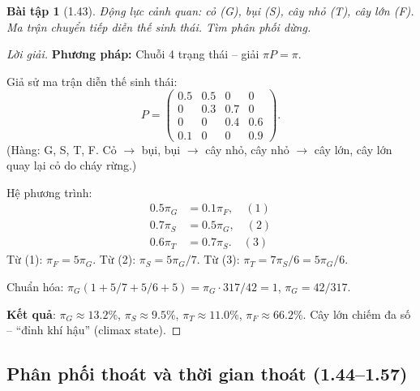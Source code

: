 \documentclass[8pt,a4paper]{article}
\newtheorem{exercise}{Bài tập}
\newenvironment{solution}{\begin{proof}[Lời giải]}{\end{proof}}
\begin{document}
\begin{exercise}[1.43]
Động lực cảnh quan: cỏ (G), bụi (S), cây nhỏ (T), cây lớn (F). Ma trận chuyển tiếp diễn thế sinh thái. Tìm phân phối dừng.
\end{exercise}
\begin{solution}
\textbf{Phương pháp:} Chuỗi 4 trạng thái -- giải $\pi P = \pi$.

Giả sử ma trận diễn thế sinh thái:
\[
  P = \begin{pmatrix} 0.5 & 0.5 & 0 & 0 \\ 0 & 0.3 & 0.7 & 0 \\ 0 & 0 & 0.4 & 0.6 \\ 0.1 & 0 & 0 & 0.9 \end{pmatrix}.
\]
(Hàng: G, S, T, F. Cỏ $\to$ bụi, bụi $\to$ cây nhỏ, cây nhỏ $\to$ cây lớn, cây lớn quay lại cỏ do cháy rừng.)

Hệ phương trình:
\begin{align*}
  0.5\pi_G &= 0.1\pi_F, \quad (1) \\
  0.7\pi_S &= 0.5\pi_G, \quad (2) \\
  0.6\pi_T &= 0.7\pi_S. \quad (3)
\end{align*}
Từ (1): $\pi_F = 5\pi_G$. Từ (2): $\pi_S = 5\pi_G/7$. Từ (3): $\pi_T = 7\pi_S/6 = 5\pi_G/6$.

Chuẩn hóa: $\pi_G(1 + 5/7 + 5/6 + 5) = \pi_G \cdot 317/42 = 1$, $\pi_G = 42/317$.

\textbf{Kết quả}: $\pi_G \approx 13.2\%$, $\pi_S \approx 9.5\%$, $\pi_T \approx 11.0\%$, $\pi_F \approx 66.2\%$. Cây lớn chiếm đa số -- ``đỉnh khí hậu'' (climax state).
\end{solution}

\subsection*{Phân phối thoát và thời gian thoát (1.44--1.57)}
\end{document}
